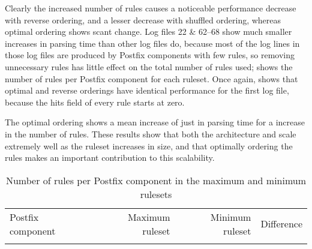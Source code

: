 Clearly the increased number of rules causes a noticeable performance
decrease with reverse ordering, and a lesser decrease with shuffled
ordering, whereas optimal ordering shows scant change.  Log files 22 \&
62--68 show much smaller increases in parsing time than other log files do,
because most of the log lines in those log files are produced by Postfix
components with few rules, so removing unnecessary rules has little effect
on the total number of rules used;  shows the number of rules
per Postfix component for each ruleset.  Once again,  shows that optimal and reverse orderings have identical
performance for the first log file, because the hits field of every rule
starts at zero.

The optimal ordering shows a mean increase of just
 in parsing time
for a \numberOFrulesMAXIMUMpercentage{} increase in the number of rules.
These results show that both the architecture and \parsername{} scale
extremely well as the ruleset increases in size, and that optimally
ordering the rules makes an important contribution to this scalability.



\begin{table}[thbp]
    \caption{Number of rules per Postfix component in the maximum and
    minimum rulesets}
    \empty{}\label{Number of rules per Postfix component in the maximum and
    minimum rulesets}
    \centering{}
    \begin{tabular}{lrrr}
        \tabletopline{}%
        Postfix component & Maximum ruleset & Minimum ruleset & Difference \\
        \tablemiddleline{}%
        
        \tablebottomline{}%
    \end{tabular}
\end{table}

